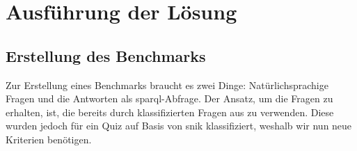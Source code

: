 \chapter{Ausführung der Lösung}\label{ch:solution}

\section{Erstellung des Benchmarks}

Zur Erstellung eines Benchmarks braucht es zwei Dinge:
Natürlichsprachige Fragen und die Antworten als \ac{sparql}-Abfrage.
Der Ansatz, um die Fragen zu erhalten, ist, die bereits durch \citet{arneba} klassifizierten Fragen aus \citet{bb} zu verwenden.
Diese wurden jedoch für ein Quiz auf Basis von \ac{snik} klassifiziert, weshalb wir nun neue Kriterien benötigen.

